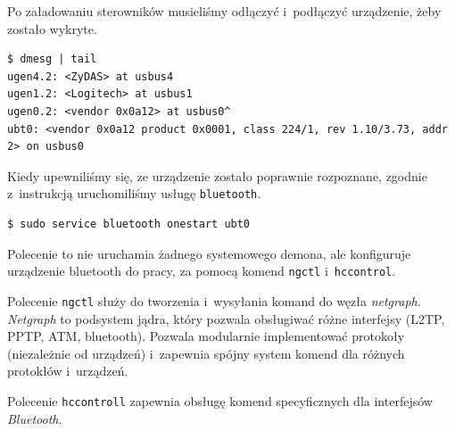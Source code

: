 Po załadowaniu sterowników musieliśmy odłączyć i~podłączyć urządzenie, żeby zostało wykryte.

\begin{lstlisting}[caption={Sprawdzenie, że urządzenie zostało wykryte}]
$ dmesg | tail
ugen4.2: <ZyDAS> at usbus4
ugen1.2: <Logitech> at usbus1
ugen0.2: <vendor 0x0a12> at usbus0^
ubt0: <vendor 0x0a12 product 0x0001, class 224/1, rev 1.10/3.73, addr 2> on usbus0
\end{lstlisting}

Kiedy upewniliśmy się, ze urządzenie zostało poprawnie rozpoznane, zgodnie z~instrukcją uruchomiliśmy usługę \texttt{bluetooth}.
\begin{lstlisting}[caption={Sprawdzenie, że urządzenie zostało wykryte}]
$ sudo service bluetooth onestart ubt0
\end{lstlisting}
Polecenie to nie uruchamia żadnego systemowego demona, ale konfiguruje urządzenie bluetooth do pracy, za pomocą komend \texttt{ngctl} i~\texttt{hccontrol}.

Polecenie \texttt{ngctl} służy do tworzenia i~wysyłania komand do węzła \emph{netgraph}.
\emph{Netgraph} to podsystem jądra, który pozwala obsługiwać różne interfejsy (L2TP, PPTP, ATM, bluetooth). Pozwala modularnie implementować protokoły (niezależnie od urządzeń) i~zapewnia spójny system komend dla różnych protokłów i~urządzeń\cite{man:netgraph}.

Polecenie \texttt{hccontroll} zapewnia obsługę komend specyficznych dla interfejsów \emph{Bluetooth}.

